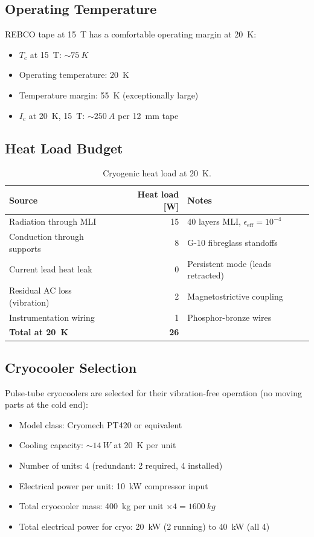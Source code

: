 \documentclass[11pt,a4paper]{article}
\begin{document}
\subsection{Operating Temperature}

REBCO tape at \SI{15}{T} has a comfortable operating margin at \SI{20}{K}:
\begin{itemize}[nosep]
\item $T_c$ at \SI{15}{T}: $\sim\!\SI{75}{K}$
\item Operating temperature: \SI{20}{K}
\item Temperature margin: \SI{55}{K} (exceptionally large)
\item $I_c$ at \SI{20}{K}, \SI{15}{T}: $\sim\!\SI{250}{A}$ per \SI{12}{mm} tape
\end{itemize}

\subsection{Heat Load Budget}

\begin{table}[h]
\centering
\caption{Cryogenic heat load at \SI{20}{K}.}
\label{tab:heat_load}
\begin{tabular}{@{}lrl@{}}
\toprule
Source & Heat load [\si{W}] & Notes \\
\midrule
Radiation through MLI & 15 & 40 layers MLI, $\epsilon_{\mathrm{eff}} = 10^{-4}$ \\
Conduction through supports & 8 & G-10 fibreglass standoffs \\
Current lead heat leak & 0 & Persistent mode (leads retracted) \\
Residual AC loss (vibration) & 2 & Magnetostrictive coupling \\
Instrumentation wiring & 1 & Phosphor-bronze wires \\
\midrule
\textbf{Total at \SI{20}{K}} & \textbf{26} & \\
\bottomrule
\end{tabular}
\end{table}

\subsection{Cryocooler Selection}

Pulse-tube cryocoolers are selected for their vibration-free operation
(no moving parts at the cold end):

\begin{itemize}[nosep]
\item Model class: Cryomech PT420 or equivalent
\item Cooling capacity: $\sim\!\SI{14}{W}$ at \SI{20}{K} per unit
\item Number of units: 4 (redundant: 2 required, 4 installed)
\item Electrical power per unit: \SI{10}{kW} compressor input
\item Total cryocooler mass: \SI{400}{kg} per unit $\times 4 = \SI{1600}{kg}$
\item Total electrical power for cryo: \SI{20}{kW} (2 running) to \SI{40}{kW} (all 4)
\end{itemize}
\end{document}
